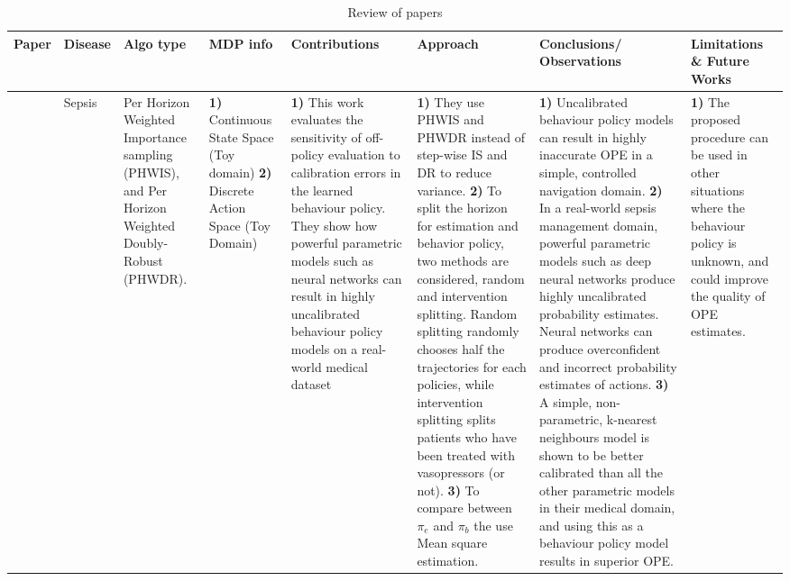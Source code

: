 \begin{table}[!th]
\caption{Review of papers}
\label{tab:review4}
\begin{tabular}{|p{3 em}|p{3 em}|p{3 em}|p{3em}|p{6em}|p{8em}|p{7 em}|p{6em}|}
\toprule
Paper  & Disease  & Algo type & MDP info & Contributions  & Approach & Conclusions/ Observations  & Limitations \& Future Works \\
\hline
\citet{DBLP:journals/corr/abs-1807-01066} & Sepsis 
& 
Per Horizon Weighted Importance sampling (PHWIS), and Per Horizon Weighted Doubly-Robust (PHWDR).
& 
\textbf{1)} Continuous State Space (Toy domain)
\textbf{2)} Discrete Action Space (Toy Domain)
&  
\textbf{1)} This work evaluates the sensitivity of off-policy evaluation
to calibration errors in the learned behaviour policy. They show how powerful parametric models such as neural networks can result in highly uncalibrated behaviour policy models on a real-world medical dataset
&
\textbf{1)} They use PHWIS and PHWDR instead of step-wise IS and DR to reduce variance. \textbf{2)} To split the horizon for estimation and behavior policy, two methods are considered, random and intervention splitting. Random splitting randomly chooses half the trajectories for each policies, while intervention splitting splits patients who have been treated with vasopressors (or not).  \textbf{3)} To compare between $\pi_e$ and $\pi_b$ the use Mean square estimation.
& 
\textbf{1)} Uncalibrated behaviour policy models can result in
highly inaccurate OPE in a simple, controlled navigation
domain.
\textbf{2)} In a real-world sepsis management domain, powerful
parametric models such as deep neural networks produce
highly uncalibrated probability estimates. Neural networks can produce overconfident and incorrect probability estimates of actions.
\textbf{3)} A simple, non-parametric, k-nearest neighbours model
is shown to be better calibrated than all the other parametric models
in their medical domain, and using this as a behaviour
policy model results in superior OPE.
& 
\textbf{1)} The proposed
procedure can be used in other situations where the
behaviour policy is unknown, and could improve the quality
of OPE estimates.
   \\\midrule
\end{tabular}
\vspace*{-2em}
\end{table}   


